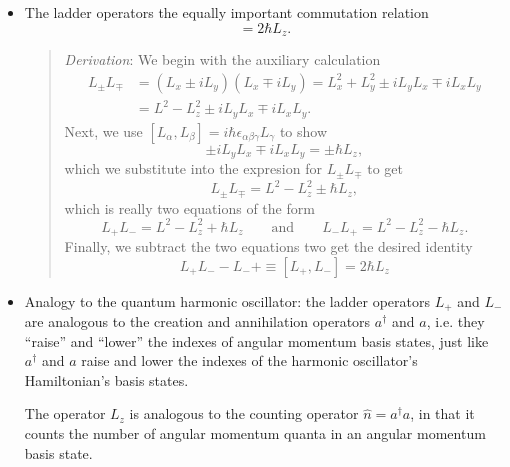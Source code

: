\documentclass[11pt, a4paper]{article}
\begin{document}
\begin{itemize}
	\item The ladder operators the equally important commutation relation
    \begin{equation*}
        [L_{+}, L_{-}] = 2 \hbar L_{z}.
    \end{equation*}
    \begin{quote}
        \textit{Derivation}: We begin with the auxiliary calculation
        \begin{align*}
            L_{\pm}L_{\mp} &= (L_{x} \pm i L_{y})(L_{x} \mp i L_{y}) = L_{x}^{2} + L_{y}^{2} \pm i L_{y}L_{x} \mp i L_{x}L_{y} \\
            & = L^{2} - L_{z}^{2} \pm i L_{y}L_{x} \mp i L_{x}L_{y}.
        \end{align*}
        Next, we use $ [L_{\alpha}, L_{\beta}] = i \hbar \epsilon_{\alpha \beta \gamma} L_{\gamma}  $ to show 
        \begin{equation*}
            \pm i L_{y}L_{x} \mp i L_{x}L_{y} = \pm \hbar L_{z},
        \end{equation*}
        which we substitute into the expresion for $ L_{\pm}L_{\mp} $ to get
        \begin{equation*}
            L_{\pm}L_{\mp} = L^{2} - L_{z}^{2} \pm \hbar L_{z},
        \end{equation*}
        which is really two equations of the form
        \begin{equation*}
            L_{+} L_{-} = L^{2} - L_{z}^{2} + \hbar L_{z} \qquad \text{and} \qquad L_{-} L_{+} = L^{2} - L_{z}^{2} - \hbar L_{z}.
        \end{equation*}
        Finally, we subtract the two equations two get the desired identity
        \begin{equation*}
            L_{+}L_{-} - L_{-}{+}  \equiv [L_{+}, L_{-}] = 2 \hbar L_{z}
        \end{equation*}
    \end{quote}
    

	
	\item Analogy to the quantum harmonic oscillator: the ladder operators $ L_{+} $ and $ L_{-} $ are analogous to the creation and annihilation operators $ a^{\dagger} $  and $ a $, i.e. they ``raise'' and ``lower'' the indexes of angular momentum basis states, just like $ a^{\dagger} $ and $ a $ raise and lower the indexes of the harmonic oscillator's Hamiltonian's basis states. 
	
	The operator $ L_{z} $ is analogous to the counting operator $ \hat{n} = a^{\dagger}a $, in that it counts the number of angular momentum quanta in an angular momentum basis state. 

\end{itemize}
\end{document}
